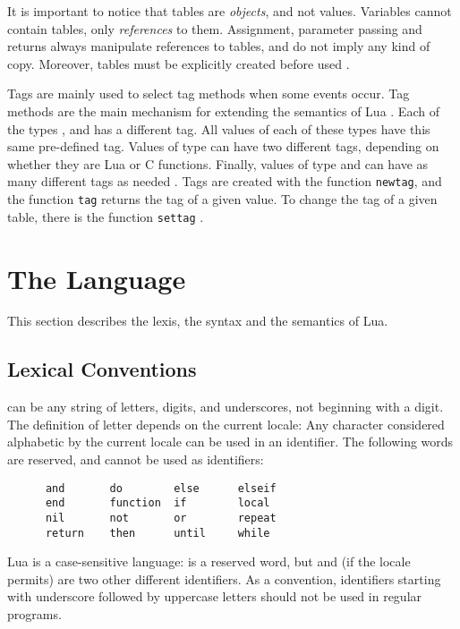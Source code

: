 It is important to notice that tables are \emph{objects}, and not values.
Variables cannot contain tables, only \emph{references} to them.
Assignment, parameter passing and returns always manipulate references
to tables, and do not imply any kind of copy.
Moreover, tables must be explicitly created before used
.

Tags are mainly used to select tag methods when
some events occur.
Tag methods are the main mechanism for extending the
semantics of Lua .
Each of the types ,  and  has a different tag.
All values of each of these types have this same pre-defined tag.
Values of type  can have two different tags,
depending on whether they are Lua or C functions.
Finally,
values of type  and  can have
as many different tags as needed .
Tags are created with the function \verb|newtag|,
and the function \verb|tag| returns the tag of a given value.
To change the tag of a given table,
there is the function \verb|settag| .


\section{The Language}

This section describes the lexis, the syntax and the semantics of Lua.


\subsection{Lexical Conventions} \label{lexical}

 can be any string of letters, digits, and underscores,
not beginning with a digit.
The definition of letter depends on the current locale:
Any character considered alphabetic by the current locale
can be used in an identifier.
The following words are reserved, and cannot be used as identifiers:
\begin{verbatim}
      and       do        else      elseif
      end       function  if        local
      nil       not       or        repeat
      return    then      until     while
\end{verbatim}
Lua is a case-sensitive language:
 is a reserved word, but  and 
(if the locale permits) are two other different identifiers.
As a convention, identifiers starting with underscore followed by
uppercase letters should not be used in regular programs.


